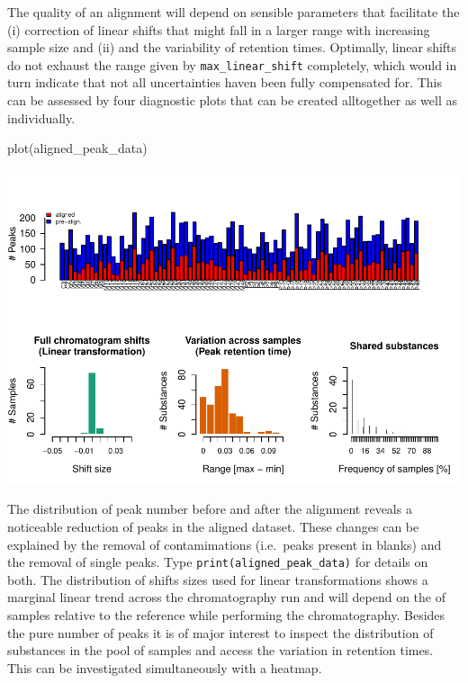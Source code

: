 The quality of an alignment will depend on sensible parameters that
facilitate the (i) correction of linear shifts that might fall in a
larger range with increasing sample size and (ii) and the variability of
retention times. Optimally, linear shifts do not exhaust the range given
by \texttt{max\_linear\_shift} completely, which would in turn indicate
that not all uncertainties haven been fully compensated for. This can be
assessed by four diagnostic plots that can be created alltogether as
well as individually.

\begin{Schunk}
\begin{Sinput}
plot(aligned_peak_data)
\end{Sinput}


\begin{center}\includegraphics{ottensmann-stoffel-hoffman_files/figure-latex/unnamed-chunk-7-1} \end{center}

\end{Schunk}

The distribution of peak number before and after the alignment reveals a
noticeable reduction of peaks in the aligned dataset. These changes can
be explained by the removal of contamimations (i.e.~peaks present in
blanks) and the removal of single peaks. Type
\texttt{print(aligned\_peak\_data)} for details on both. The
distribution of shifts sizes used for linear transformations shows a
marginal linear trend across the chromatography run and will depend on
the of samples relative to the reference while performing the
chromatography. Besides the pure number of peaks it is of major interest
to inspect the distribution of substances in the pool of samples and
access the variation in retention times. This can be investigated
simultaneously with a heatmap.

